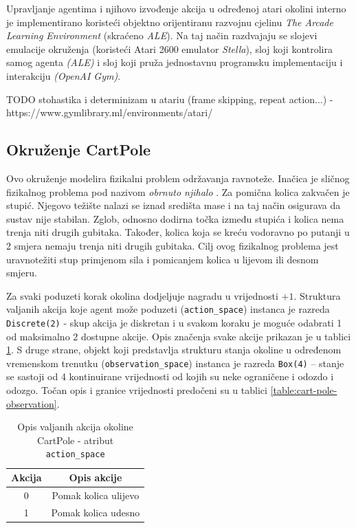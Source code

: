 Upravljanje agentima i njihovo izvođenje akcija u određenoj atari okolini interno je implementirano koristeći objektno orijentiranu razvojnu cjelinu  \textit{The Arcade Learning Environment} (skraćeno \textit{ALE}). Na taj način razdvajaju se slojevi emulacije okruženja (koristeći Atari 2600 emulator \textit{Stella}), sloj koji kontrolira samog agenta \textit{(ALE)} i sloj koji pruža jednostavnu programsku implementaciju i interakciju \textit{(OpenAI Gym)}\cite{OpenAIALE}. 

TODO stohastika i determinizam u atariu (frame skipping, repeat action...) - https://www.gymlibrary.ml/environments/atari/

\subsection{Okruženje CartPole}

Ovo okruženje modelira fizikalni problem održavanja ravnoteže. Inačica je sličnog fizikalnog problema pod nazivom \textit{obrnuto njihalo} . Za pomična kolica zakvačen je stupić. Njegovo težište nalazi se iznad središta mase i na taj način osigurava da sustav nije stabilan.  Zglob, odnosno dodirna točka između stupića i kolica nema trenja niti drugih gubitaka. Također, kolica koja se kreću vodoravno po putanji u 2 smjera nemaju trenja niti drugih gubitaka. Cilj ovog fizikalnog problema jest uravnotežiti stup primjenom sila i pomicanjem kolica u lijevom ili desnom smjeru.

Za svaki poduzeti korak okolina dodjeljuje nagradu u vrijednosti $+1$. Struktura valjanih akcija koje agent može poduzeti (\texttt{action_space}) instanca je razreda \texttt{Disc\-rete(2)} - skup akcija je diskretan i u svakom koraku je moguće odabrati 1 od maksimalno 2 dostupne akcije. Opis značenja svake akcije prikazan je u tablici \ref{table:cart-pole-action}. S druge strane, objekt koji predstavlja strukturu stanja okoline u određenom vremenskom trenutku (\texttt{observation_space}) instanca je razreda \texttt{Box(4)} – stanje se sastoji od 4 kontinuirane vrijednosti od kojih su neke ograničene i odozdo i odozgo. Točan opis i granice vrijednosti predočeni su u tablici \ref{table:cart-pole-observation}.

\begin{table}[ht]
    \centering
    \caption{Opis valjanih akcija okoline CartPole - atribut \texttt{action_space}}
    \begin{tabular}{c c}
        \toprule
        Akcija & Opis akcije  \\
        \midrule
        0 & Pomak kolica ulijevo \\
        1 & Pomak kolica udesno \\
        \bottomrule
    \end{tabular}
    \label{table:cart-pole-action}
\end{table}

